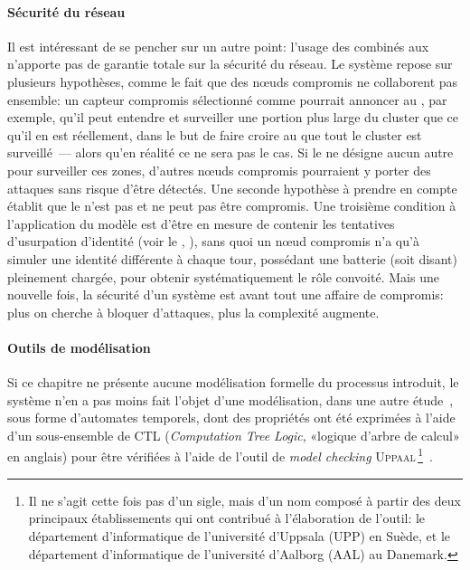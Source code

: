 \paragraph{Sécurité du réseau}
Il est intéressant de se pencher sur un autre point: l'usage des \cns combinés aux \vns n'apporte pas de garantie totale sur la sécurité du réseau.
Le système repose sur plusieurs hypothèses, comme le fait que des nœuds compromis ne collaborent pas ensemble: un capteur compromis sélectionné comme \cn pourrait annoncer au \ch, par exemple, qu'il peut entendre et surveiller une portion plus large du cluster que ce qu'il en est réellement, dans le but de faire croire au \CH que tout le cluster est surveillé~--- alors qu'en réalité ce ne sera pas le cas.
Si le \CH ne désigne aucun autre \cn pour surveiller ces zones, d'autres nœuds compromis pourraient y porter des attaques sans risque d'être détectés.
Une seconde hypothèse à prendre en compte établit que le \ch n'est pas et ne peut pas être compromis.
Une troisième condition à l'application du modèle est d'être en mesure de contenir les tentatives d'usurpation d'identité (voir le , ), sans quoi un nœud compromis n'a qu'à simuler une identité différente à chaque tour, possédant une batterie (soit disant) pleinement chargée, pour obtenir systématiquement le rôle convoité.
Mais une nouvelle fois, la sécurité d'un système est avant tout une affaire de compromis: plus on cherche à bloquer d'attaques, plus la complexité augmente.

\paragraph{Outils de modélisation}
Si ce chapitre ne présente aucune modélisation formelle du processus introduit, le système n'en a pas moins fait l'objet d'une modélisation, dans une autre étude~\cite{HMMBA14}, sous forme d'automates temporels, dont des propriétés ont été exprimées à l'aide d'un sous-ensemble de CTL (\textit{Computation Tree Logic}, «logique d'arbre de calcul» en anglais) pour être vérifiées à l'aide de l'outil de \textit{model checking} \textsc{Uppaal}\,\footnote{Il ne s'agit cette fois pas d'un sigle, mais d'un nom composé à partir des deux principaux établissements qui ont contribué à l'élaboration de l'outil: le département d'informatique de l'université d'Uppsala (UPP) en Suède, et le département d'informatique de l'université d'Aalborg (AAL) au Danemark.}~\cite{BDL04, uppaal}.
